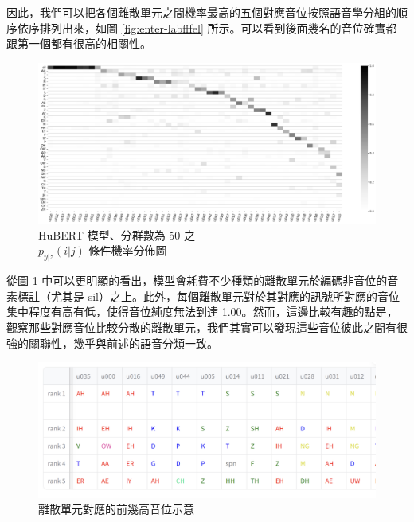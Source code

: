 {        因此，我們可以把各個離散單元之間機率最高的五個對應音位按照語音學分組的順序依序排列出來，如圖 \ref{fig:enter-labfffel} 所示。可以看到後面幾名的音位確實都跟第一個都有很高的相關性。


\begin{figure}
    \centering
    \includegraphics[width=1\linewidth]{figures/11111111.png}
    \caption{HuBERT 模型、分群數為 50 之\\
$p_{y|z}(i|j)$  條件機率分佈圖}
    \label{fig:hubert-50-givenunit-byprob}
\end{figure}
        從圖 \ref{fig:hubert-50-givenunit-byprob} 中可以更明顯的看出，模型會耗費不少種類的離散單元於編碼非音位的音素標註（尤其是 sil）之上。此外，每個離散單元對於其對應的訊號所對應的音位集中程度有高有低，使得音位純度無法到達 1.00。然而，這邊比較有趣的點是，觀察那些對應音位比較分散的離散單元，我們其實可以發現這些音位彼此之間有很強的關聯性，幾乎與前述的語音分類一致。  %

        \begin{figure}
            \centering
            \includegraphics[width=1\linewidth]{figures/unit_rank_phn.png}  %
            \caption[]{
離散單元對應的前幾高音位示意
}
            \label{fig:unit-to-phn-rankings}
        \end{figure}
        
}
